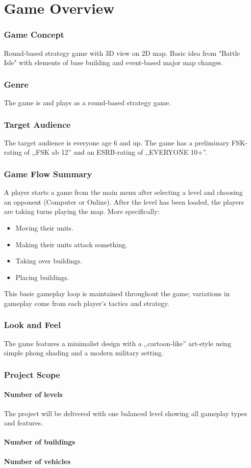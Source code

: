 \part{Game Overview}
\section{Game Concept}
Round-based strategy game with 3D view on 2D map. Basic idea from "Battle Isle" with elements of base building and
event-based major map changes.
\section{Genre}
The game is and plays as a round-based strategy game.
\section{Target Audience}
The target audience is everyone age 6 and up. The game has a preliminary FSK-rating of ,,FSK ab 12'' and an ESRB-rating of ,,EVERYONE 10+''.
\section{Game Flow Summary}
A player starts a game from the main menu after selecting a level and choosing an opponent (Computer or Online).
After the level has been loaded, the players are taking turns playing the map. More specifically:
\begin{itemize}
    \item Moving their units.
    \item Making their units attack something.
    \item Taking over buildings.
    \item Placing buildings.
\end{itemize}
This basic gameplay loop is maintained throughout the game; variations in
gameplay come from each player's tactics and strategy.
\section{Look and Feel}
The game features a minimalist design with a ,,cartoon-like'' art-style using simple phong shading and a modern military setting.
\section{Project Scope}
\subsection{Number of levels}
The project will be delivered with one balanced level showing all gameplay types and features.
\subsection{Number of buildings} %
\subsection{Number of vehicles} %
